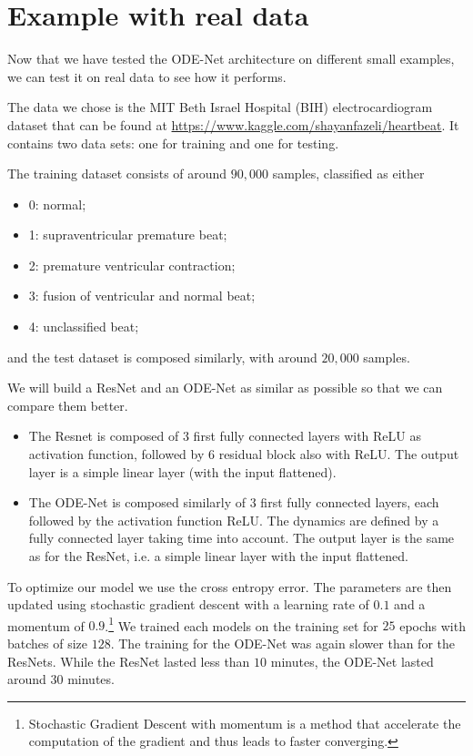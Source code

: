 \documentclass[10pt,a4paper]{article}
\theoremstyle{definition}
\theoremstyle{plain}
\begin{document}
\section{Example with real data}

Now that we have tested the ODE-Net architecture on different small examples, we can test it on real data to see how it performs. 

The data we chose is the MIT Beth Israel Hospital (BIH) electrocardiogram dataset that can be found at \url{https://www.kaggle.com/shayanfazeli/heartbeat}. It contains two data sets: one for training and one for testing.

The training dataset consists of around $90,000$ samples, classified as either 
\begin{itemize}
\item 0: normal;
\item 1: supraventricular premature beat;
\item 2: premature ventricular contraction;
\item 3: fusion of ventricular and normal beat;
\item 4: unclassified beat;
\end{itemize}
and the test dataset is composed similarly, with around $20,000$ samples.

We will build a ResNet and an ODE-Net as similar as possible so that we can compare them better.
\begin{itemize}
\item The Resnet is composed of 3 first fully connected layers with ReLU as activation function, followed by 6 residual block also with ReLU. The output layer is a simple linear layer (with the input flattened).

\item The ODE-Net is composed similarly of 3 first fully connected layers, each followed by the activation function ReLU. The dynamics are defined by a fully connected layer taking time into account. The output layer is the same as for the ResNet, i.e. a simple linear layer with the input flattened.
\end{itemize}


To optimize our model we use the cross entropy error. The parameters are then updated using stochastic gradient descent with a learning rate of $0.1$ and a momentum of $0.9$.\footnote{Stochastic Gradient Descent with momentum is a method that accelerate the computation of the gradient and thus leads to faster converging.\cite{8}}
We trained each models on the training set for $25$ epochs with batches of size $128$. The training for the ODE-Net was again slower than for the ResNets. While the ResNet lasted less than $10$ minutes, the ODE-Net lasted around $30$ minutes.
\end{document}
